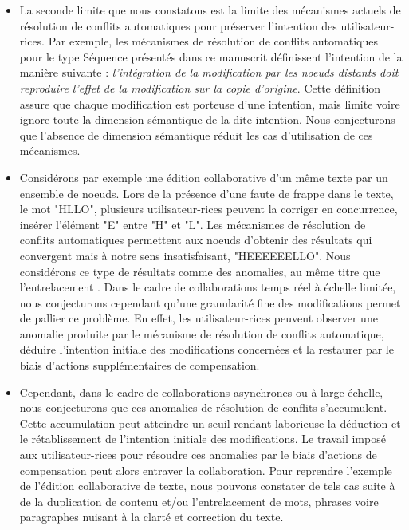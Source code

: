 \begin{itemize}
    \item La seconde limite que nous constatons est la limite des mécanismes actuels de résolution de conflits automatiques pour préserver l'intention des utilisateur-rices.
        Par exemple, les mécanismes de résolution de conflits automatiques pour le type Séquence présentés dans ce manuscrit  définissent l'intention de la manière suivante : \emph{l'intégration de la modification par les noeuds distants doit reproduire l'effet de la modification sur la copie d'origine}.
        Cette définition assure que chaque modification est porteuse d'une intention, mais limite voire ignore toute la dimension sémantique de la dite intention.
        Nous conjecturons que l'absence de dimension sémantique réduit les cas d'utilisation de ces mécanismes.
    \item Considérons par exemple une édition collaborative d'un même texte par un ensemble de noeuds.
        Lors de la présence d'une faute de frappe dans le texte, \eg le mot "HLLO", plusieurs utilisateur-rices peuvent la corriger en concurrence, \ie insérer l'élément "E" entre "H" et "L".
        Les mécanismes de résolution de conflits automatiques permettent aux noeuds d'obtenir des résultats qui convergent mais à notre sens insatisfaisant, \eg "HEEEEEELLO".
        Nous considérons ce type de résultats comme des anomalies, au même titre que l'entrelacement \cite{2019-interleaving-anomalies-collaborative-editors-kleppmann}.
        Dans le cadre de collaborations temps réel à échelle limitée, nous conjecturons cependant qu'une granularité fine des modifications permet de pallier ce problème.
        En effet, les utilisateur-rices peuvent observer une anomalie produite par le mécanisme de résolution de conflits automatique, déduire l'intention initiale des modifications concernées et la restaurer par le biais d'actions supplémentaires de compensation.
    \item Cependant, dans le cadre de collaborations asynchrones ou à large échelle, nous conjecturons que ces anomalies de résolution de conflits s'accumulent.
        Cette accumulation peut atteindre un seuil rendant laborieuse la déduction et le rétablissement de l'intention initiale des modifications.
        Le travail imposé aux utilisateur-rices pour résoudre ces anomalies par le biais d'actions de compensation peut alors entraver la collaboration.
        Pour reprendre l'exemple de l'édition collaborative de texte, nous pouvons constater de tels cas suite à de la duplication de contenu et/ou l'entrelacement de mots, phrases voire paragraphes nuisant à la clarté et correction du texte.

\end{itemize}
